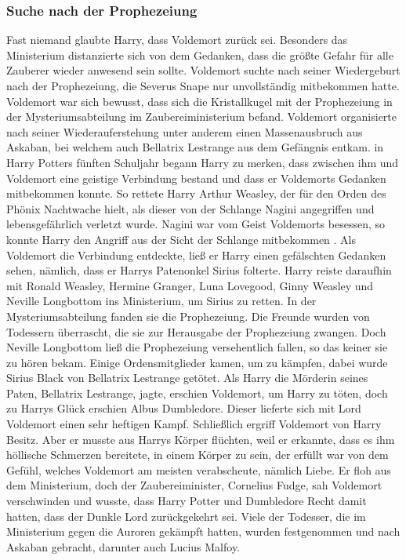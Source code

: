 \documentclass[a4paper, 10pt]{article}
\begin{document}
\subsubsection*{\large Suche nach der Prophezeiung}
Fast niemand glaubte Harry, dass Voldemort zurück sei. Besonders das Ministerium distanzierte sich von dem Gedanken, dass die größte Gefahr für alle Zauberer wieder anwesend sein sollte. Voldemort suchte nach seiner Wiedergeburt nach der Prophezeiung, die Severus Snape nur unvollständig mitbekommen hatte. Voldemort war sich bewusst, dass sich die Kristallkugel mit der Prophezeiung in der Mysteriumsabteilung im Zaubereiministerium befand.
\vspace{10pt}
\newline
{}  
Voldemort organisierte nach seiner Wiederauferstehung unter anderem einen Massenausbruch aus Askaban, bei welchem auch Bellatrix Lestrange aus dem Gefängnis entkam.
\vspace{10pt}
\newline
{}  
in Harry Potters fünften Schuljahr begann Harry zu merken, dass zwischen ihm und Voldemort eine geistige Verbindung bestand und dass er Voldemorts Gedanken mitbekommen konnte. So rettete Harry Arthur Weasley, der für den Orden des Phönix Nachtwache hielt, als dieser von der Schlange Nagini angegriffen und lebensgefährlich verletzt wurde. Nagini war vom Geist Voldemorts besessen, so konnte Harry den Angriff aus der Sicht der Schlange mitbekommen . Als Voldemort die Verbindung entdeckte, ließ er Harry einen gefälschten Gedanken sehen, nämlich, dass er Harrys Patenonkel Sirius folterte. Harry reiste daraufhin mit Ronald Weasley, Hermine Granger, Luna Lovegood, Ginny Weasley und Neville Longbottom ins Ministerium, um Sirius zu retten. In der Mysteriumsabteilung fanden sie die Prophezeiung. Die Freunde wurden von Todessern überrascht, die sie zur Herausgabe der Prophezeiung zwangen. Doch Neville Longbottom ließ die Prophezeiung versehentlich fallen, so das keiner sie zu hören bekam.
\vspace{10pt}
\newline
{}  
Einige Ordensmitglieder kamen, um zu kämpfen, dabei wurde Sirius Black von Bellatrix Lestrange getötet. Als Harry die Mörderin seines Paten, Bellatrix Lestrange, jagte, erschien Voldemort, um Harry zu töten, doch zu Harrys Glück erschien Albus Dumbledore. Dieser lieferte sich mit Lord Voldemort einen sehr heftigen Kampf. Schließlich ergriff Voldemort von Harry Besitz. Aber er musste aus Harrys Körper flüchten, weil er erkannte, dass es ihm höllische Schmerzen bereitete, in einem Körper zu sein, der erfüllt war von dem Gefühl, welches Voldemort am meisten verabscheute, nämlich Liebe. Er floh aus dem Ministerium, doch der Zaubereiminister, Cornelius Fudge, sah Voldemort verschwinden und wusste, dass Harry Potter und Dumbledore Recht damit hatten, dass der Dunkle Lord zurückgekehrt sei.
\vspace{10pt}
\newline
{}  
Viele der Todesser, die im Ministerium gegen die Auroren gekämpft hatten, wurden festgenommen und nach Askaban gebracht, darunter auch Lucius Malfoy.
\end{document}
